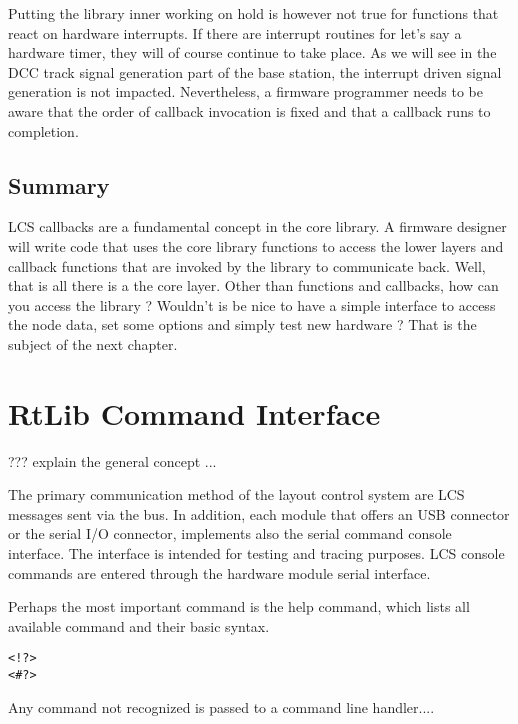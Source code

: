 Putting the library inner working on hold is however not true for functions that react on hardware interrupts. If there are interrupt routines for let's say a hardware timer, they will of course continue to take place. As we will see in the DCC track signal generation part of the base station, the interrupt driven signal generation is not impacted. Nevertheless, a firmware programmer needs to be aware that the order of callback invocation is fixed and that a callback runs to completion.

\section{Summary}

LCS callbacks are a fundamental concept in the core library. A firmware designer will write code that uses the core library functions to access the lower layers and callback functions that are invoked by the library to communicate back. Well, that is all there is a the core layer. Other than functions and callbacks, how can you access the library ? Wouldn't is be nice to have a simple interface to access the node data, set some options and simply test new hardware ? That is the subject of the next chapter.

\chapter{RtLib Command Interface}

???  explain the general concept ...

The primary communication method of the layout control system are LCS messages sent via the bus. In addition, each module that offers an USB connector or the serial I/O connector, implements also the serial command console interface. The interface is intended for testing and tracing purposes. LCS console commands are entered through the hardware module serial interface. 

Perhaps the most important command is the help command, which lists all available command and  their basic syntax.

\lstset{style=codesnippetstyle}
\begin{lstlisting}
<!?>
<#?>
\end{lstlisting}

Any command not recognized is passed to a command line handler....

